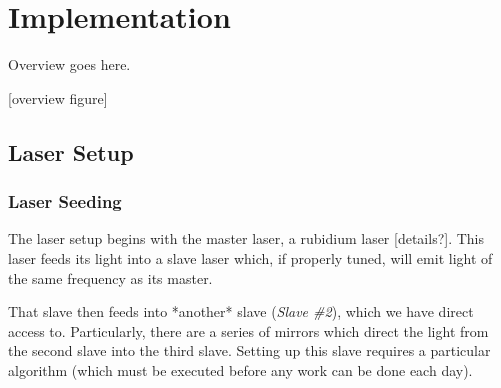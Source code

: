 \newpage
\section{Implementation}
\label{sec:implementation}

Overview goes here.

[overview figure]

\subsection{Laser Setup}
    \subsubsection{Laser Seeding}

The laser setup begins with the master laser, a rubidium laser [details?].  This laser feeds its light into a slave laser which, if properly tuned, will emit light of the same frequency as its master.

That slave then feeds into *another* slave (\emph{Slave \#2}), which we have direct access to.  Particularly, there are a series of mirrors which direct the light from the second slave into the third slave.  Setting up this slave requires a particular algorithm (which must be executed before any work can be done each day).

